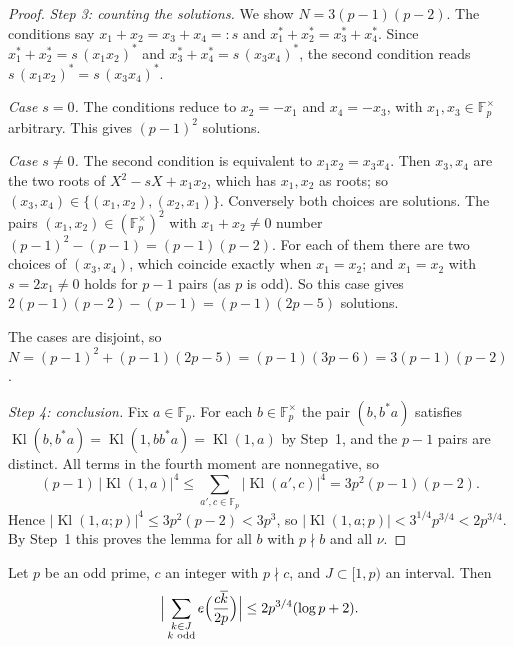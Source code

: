 \begin{proof}
\emph{Step 3: counting the solutions.} We show $N=3(p-1)(p-2)$. The conditions say $x_1+x_2=x_3+x_4=:s$ and $x_1^*+x_2^*=x_3^*+x_4^*$. Since $x_1^*+x_2^*=s\,(x_1x_2)^*$ and $x_3^*+x_4^*=s\,(x_3x_4)^*$, the second condition reads $s\,(x_1x_2)^*=s\,(x_3x_4)^*$.

\emph{Case $s=0$.} The conditions reduce to $x_2=-x_1$ and $x_4=-x_3$, with $x_1,x_3\in\mathbb F_p^\times$ arbitrary. This gives $(p-1)^2$ solutions.

\emph{Case $s\ne0$.} The second condition is equivalent to $x_1x_2=x_3x_4$. Then $x_3,x_4$ are the two roots of $X^2-sX+x_1x_2$, which has $x_1,x_2$ as roots; so $(x_3,x_4)\in\{(x_1,x_2),(x_2,x_1)\}$. Conversely both choices are solutions. The pairs $(x_1,x_2)\in(\mathbb F_p^\times)^2$ with $x_1+x_2\ne0$ number $(p-1)^2-(p-1)=(p-1)(p-2)$. For each of them there are two choices of $(x_3,x_4)$, which coincide exactly when $x_1=x_2$; and $x_1=x_2$ with $s=2x_1\ne0$ holds for $p-1$ pairs (as $p$ is odd). So this case gives $2(p-1)(p-2)-(p-1)=(p-1)(2p-5)$ solutions.

The cases are disjoint, so $N=(p-1)^2+(p-1)(2p-5)=(p-1)(3p-6)=3(p-1)(p-2)$.

\emph{Step 4: conclusion.} Fix $a\in\mathbb F_p$. For each $b\in\mathbb F_p^\times$ the pair $(b,b^*a)$ satisfies $\operatorname{Kl}(b,b^*a)=\operatorname{Kl}(1,bb^*a)=\operatorname{Kl}(1,a)$ by Step~1, and the $p-1$ pairs are distinct. All terms in the fourth moment are nonnegative, so
\[
(p-1)\,|\operatorname{Kl}(1,a)|^4\le\sum_{a',c\in\mathbb F_p}|\operatorname{Kl}(a',c)|^4=3p^2(p-1)(p-2).
\]
Hence $|\operatorname{Kl}(1,a;p)|^4\le3p^2(p-2)<3p^3$, so $|\operatorname{Kl}(1,a;p)|<3^{1/4}p^{3/4}<2p^{3/4}$. By Step~1 this proves the lemma for all $b$ with $p\nmid b$ and all $\nu$.
\end{proof}

\begin{lemma}\label{lem:incomplete}
Let $p$ be an odd prime, $c$ an integer with $p\nmid c$, and $J\subset[1,p)$ an interval. Then
\[
\Big|\sum_{\substack{k\in J\\ k\text{ odd}}}e\Bigl(\frac{c\overline{k}}{2p}\Bigr)\Big|\le2p^{3/4}(\log p+2).
\]
\end{lemma}

